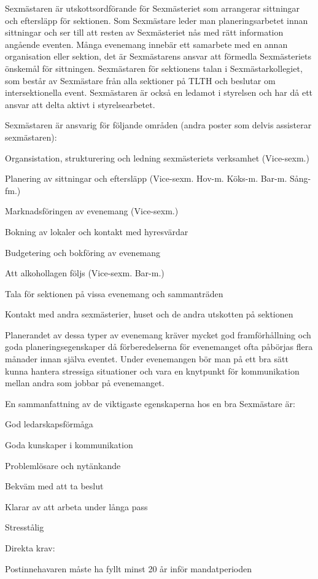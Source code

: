 \documentclass[10pt]{article}
\def\post{Sexmästare}
\def\doctitle{Kravprofil för \post}
\begin{document}
\heading{\doctitle}


{\post}n är utskottsordförande för Sexmästeriet som arrangerar sittningar och eftersläpp för sektionen. Som {\post} leder man planeringsarbetet innan sittningar och ser till att resten av Sexmästeriet nås med rätt information angående eventen. Många evenemang innebär ett samarbete med en annan organisation eller sektion, det är Sexmästarens ansvar att förmedla Sexmästeriets önskemål för sittningen. Sexmästaren för sektionens talan i Sexmästarkollegiet, som består av Sexmästare från alla sektioner på TLTH och beslutar om intersektionella event. Sexmästaren är också en ledamot i styrelsen och har då ett ansvar att delta aktivt i styrelsearbetet.


{\post}n är ansvarig för följande områden (andra poster som delvis assisterar sexmästaren):
\begin{dashlist}
    \item Organsistation, strukturering och ledning sexmästeriets verksamhet (Vice-sexm.)
    \item Planering av sittningar och eftersläpp (Vice-sexm. Hov-m. Köks-m. Bar-m. Sång-fm.)
    \item Marknadsföringen av evenemang (Vice-sexm.)
    \item Bokning av lokaler och kontakt med hyresvärdar
    \item Budgetering och bokföring av evenemang
    \item Att alkohollagen följs (Vice-sexm. Bar-m.)
    \item Tala för sektionen på vissa evenemang och sammanträden
    \item Kontakt med andra sexmästerier, huset och de andra utskotten på sektionen
\end{dashlist}


Planerandet av dessa typer av evenemang kräver mycket god framförhållning och goda planeringsegenskaper då förberedelserna för evenemanget ofta påbörjas flera månader innan själva eventet. Under evenemangen bör man på ett bra sätt kunna hantera stressiga situationer och vara en knytpunkt för kommunikation mellan andra som jobbar på evenemanget.


En sammanfattning av de viktigaste egenskaperna hos en bra {\post} är:
\begin{dashlist}
    \item God ledarskapsförmåga
    \item Goda kunskaper i kommunikation
    \item Problemlösare och nytänkande
    \item Bekväm med att ta beslut
    \item Klarar av att arbeta under långa pass
    \item Stresstålig
\end{dashlist}

Direkta krav:
\begin{dashlist}
    \item Postinnehavaren måste ha fyllt minst 20 år inför mandatperioden
\end{dashlist}
\end{document}
